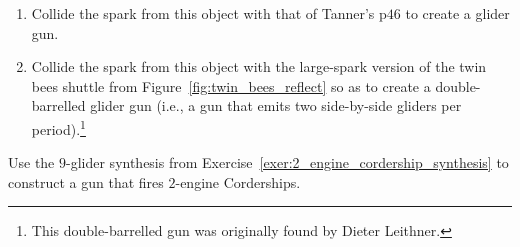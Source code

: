 \begin{multicols}{2}
\begin{problem}
		\begin{enumerate}[label=\bf\color{ocre}(\alph*)]
			\item {} Collide the spark from this object with that of Tanner's p$46$ to create a glider gun.
			
			
			\item {} Collide the spark from this object with the large-spark version of the twin bees shuttle from Figure~\ref{fig:twin_bees_reflect} so as to create a double-barrelled glider gun (i.e., a gun that emits two side-by-side gliders per period).\footnote{This double-barrelled gun was originally found by Dieter Leithner.}
		\end{enumerate}
	\end{problem}
	
	
	\mfilbreak
	
	
	\begin{problem}\label{exer:2eng_corder_gun} 
		Use the $9$-glider synthesis from Exercise~\ref{exer:2_engine_cordership_synthesis} to construct a gun that fires $2$-engine Corderships.
		
	\end{problem}
	

\end{multicols}
